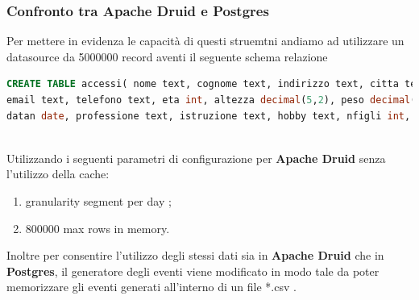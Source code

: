 \documentclass{article}
\begin{document}
\subsubsection{Confronto tra Apache Druid e Postgres}
Per mettere in evidenza le capacità di questi struemtni andiamo ad utilizzare un datasource da 5000000 record aventi il seguente schema relazione
\begin{lstlisting}[language=SQL]
CREATE TABLE accessi( nome text, cognome text, indirizzo text, citta text, stato text, cap int, 
email text, telefono text, eta int, altezza decimal(5,2), peso decimal(5,2), reddito decimal(6,2), 
datan date, professione text, istruzione text, hobby text, nfigli int, codice_cliente int, datareg timestamp,__time timestamp);
    
\end{lstlisting}
Utilizzando i seguenti parametri di configurazione per \textbf{Apache Druid} senza l'utilizzo della cache:
\begin{enumerate}
    \item granularity segment per day ;
    \item 800000 max rows in memory.
\end{enumerate}
Inoltre per consentire l'utilizzo degli stessi dati sia in \textbf{Apache Druid} che in \textbf{Postgres},  il generatore degli eventi viene modificato in modo tale da poter memorizzare gli eventi generati all'interno di un file *.csv  . 
\pagebreak
\end{document}
